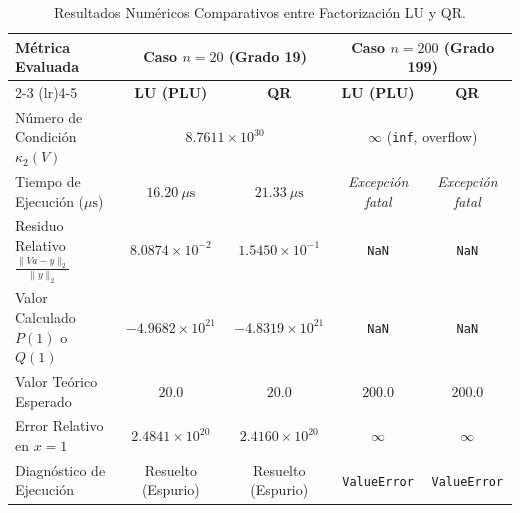 \documentclass[11pt,a4paper]{article}
\theoremstyle{definition}
\theoremstyle{remark}
\begin{document}
\begin{table}[h!]
    \centering
    \renewcommand{\arraystretch}{1.3}
    \caption{Resultados Numéricos Comparativos entre Factorización LU y QR.}
    \label{tab:resultados_experimentales_doc}
    \begin{tabular}{lcccc}
        \toprule
        \textbf{Métrica Evaluada} & \multicolumn{2}{c}{\textbf{Caso $n = 20$ (Grado 19)}} & \multicolumn{2}{c}{\textbf{Caso $n = 200$ (Grado 199)}} \\
        \cmidrule(lr){2-3} \cmidrule(lr){4-5}
        & \textbf{LU (PLU)} & \textbf{QR} & \textbf{LU (PLU)} & \textbf{QR} \\
        \midrule
        Número de Condición $\kappa_2(V)$ & \multicolumn{2}{c}{$8.7611 \times 10^{30}$} & \multicolumn{2}{c}{$\infty$ (\texttt{inf}, overflow)} \\
        Tiempo de Ejecución ($\mu\text{s}$) & $16.20\ \mu\text{s}$ & $21.33\ \mu\text{s}$ & \textit{Excepción fatal} & \textit{Excepción fatal} \\
        Residuo Relativo $\frac{\|Va - y\|_2}{\|y\|_2}$ & $8.0874 \times 10^{-2}$ & $1.5450 \times 10^{-1}$ & \texttt{NaN} & \texttt{NaN} \\
        Valor Calculado $P(1)$ o $Q(1)$ & $-4.9682 \times 10^{21}$ & $-4.8319 \times 10^{21}$ & \texttt{NaN} & \texttt{NaN} \\
        Valor Teórico Esperado & $20.0$ & $20.0$ & $200.0$ & $200.0$ \\
        Error Relativo en $x = 1$ & $2.4841 \times 10^{20}$ & $2.4160 \times 10^{20}$ & $\infty$ & $\infty$ \\
        Diagnóstico de Ejecución & Resuelto (Espurio) & Resuelto (Espurio) & \texttt{ValueError} & \texttt{ValueError} \\
        \bottomrule
    \end{tabular}
\end{table}
\end{document}
